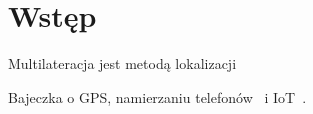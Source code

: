 \chapter*{Wstęp}\label{chap:introduction}

Multilateracja jest metodą lokalizacji

Bajeczka o GPS, namierzaniu telefonów~\cite{govinfo} i IoT~\cite{9184896}.